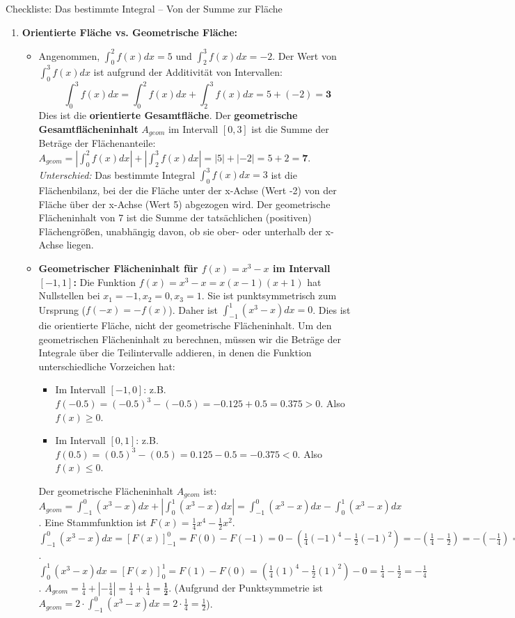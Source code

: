 \begin{loesungsumgebung}{Checkliste: Das bestimmte Integral – Von der Summe zur Fläche}
\begin{enumerate}[label=(\alph*)]
    \item \textbf{Orientierte Fläche vs. Geometrische Fläche:}
    \begin{itemize}
        \item Angenommen, $\int_0^2 f(x)dx = 5$ und $\int_2^3 f(x)dx = -2$.
        Der Wert von $\int_0^3 f(x)dx$ ist aufgrund der Additivität von Intervallen:
        $$ \int_0^3 f(x)dx = \int_0^2 f(x)dx + \int_2^3 f(x)dx = 5 + (-2) = \mathbf{3} $$
        Dies ist die \textbf{orientierte Gesamtfläche}.
        Der \textbf{geometrische Gesamtflächeninhalt} $A_{geom}$ im Intervall $[0,3]$ ist die Summe der Beträge der Flächenanteile:
        $A_{geom} = \left| \int_0^2 f(x)dx \right| + \left| \int_2^3 f(x)dx \right| = |5| + |-2| = 5 + 2 = \mathbf{7}$.
        \textit{Unterschied:} Das bestimmte Integral $\int_0^3 f(x)dx=3$ ist die Flächenbilanz, bei der die Fläche unter der x-Achse (Wert -2) von der Fläche über der x-Achse (Wert 5) abgezogen wird. Der geometrische Flächeninhalt von 7 ist die Summe der tatsächlichen (positiven) Flächengrößen, unabhängig davon, ob sie ober- oder unterhalb der x-Achse liegen.

        \item \textbf{Geometrischer Flächeninhalt für $f(x)=x^3-x$ im Intervall $[-1,1]$:}
        Die Funktion $f(x)=x^3-x = x(x-1)(x+1)$ hat Nullstellen bei $x_1=-1, x_2=0, x_3=1$.
        Sie ist punktsymmetrisch zum Ursprung ($f(-x)=-f(x)$). Daher ist $\int_{-1}^1 (x^3-x)dx = 0$. Dies ist die orientierte Fläche, nicht der geometrische Flächeninhalt.
        Um den geometrischen Flächeninhalt zu berechnen, müssen wir die Beträge der Integrale über die Teilintervalle addieren, in denen die Funktion unterschiedliche Vorzeichen hat:
        \begin{itemize}
            \item Im Intervall $[-1,0]$: z.B. $f(-0.5) = (-0.5)^3 - (-0.5) = -0.125 + 0.5 = 0.375 > 0$. Also $f(x) \ge 0$.
            \item Im Intervall $[0,1]$: z.B. $f(0.5) = (0.5)^3 - (0.5) = 0.125 - 0.5 = -0.375 < 0$. Also $f(x) \le 0$.
        \end{itemize}
        Der geometrische Flächeninhalt $A_{geom}$ ist:
        $A_{geom} = \int_{-1}^0 (x^3-x)dx + \left| \int_0^1 (x^3-x)dx \right| = \int_{-1}^0 (x^3-x)dx - \int_0^1 (x^3-x)dx$.
        Eine Stammfunktion ist $F(x) = \frac{1}{4}x^4 - \frac{1}{2}x^2$.
        $\int_{-1}^0 (x^3-x)dx = [F(x)]_{-1}^0 = F(0) - F(-1) = 0 - (\frac{1}{4}(-1)^4 - \frac{1}{2}(-1)^2) = -(\frac{1}{4}-\frac{1}{2}) = -(-\frac{1}{4}) = \frac{1}{4}$.
        $\int_0^1 (x^3-x)dx = [F(x)]_0^1 = F(1) - F(0) = (\frac{1}{4}(1)^4 - \frac{1}{2}(1)^2) - 0 = \frac{1}{4}-\frac{1}{2} = -\frac{1}{4}$.
        $A_{geom} = \frac{1}{4} + |-\frac{1}{4}| = \frac{1}{4} + \frac{1}{4} = \mathbf{\frac{1}{2}}$.
        (Aufgrund der Punktsymmetrie ist $A_{geom} = 2 \cdot \int_{-1}^0 (x^3-x)dx = 2 \cdot \frac{1}{4} = \frac{1}{2}$).
    \end{itemize}


\end{enumerate}
\end{loesungsumgebung}
